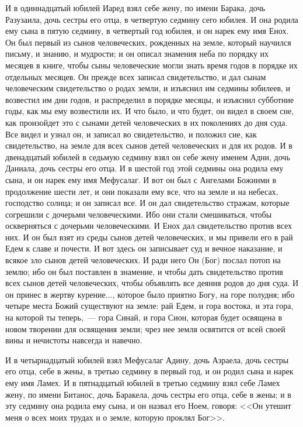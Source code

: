 И в одиннадцатый юбилей Иаред взял себе жену, по имени Барака, дочь
Разузаила, дочь сестры его отца, в четвертую седмину сего юбилея. И она родила
ему сына в пятую седмину, в четвертый год юбилея, и он нарек ему имя
Енох. Он был первый из сынов человеческих, рожденных на земле, который научился
письму, и знанию, и мудрости; и он описал знамения неба по порядку их месяцев в
книге, чтобы сыны человеческие могли знать время годов в порядке их отдельных
месяцев. Он прежде всех записал свидетельство, и дал сынам человеческим
свидетельство о родах земли, и изъяснил им седмины юбилеев, и возвестил им дни
годов, и распределил в порядке месяцы, и изъяснил субботние годы, как мы ему
возвестили их. И что было, и что будет, он видел в своем сне, как произойдет
это с сынами детей человеческих в их поколениях до дня суда. Все видел и узнал
он, и записал во свидетельство, и положил сие, как свидетельство, на земле для
всех сынов детей человеческих и для их родов. И в двенадцатый юбилей в седьмую
седмину взял он себе жену именем Адни, дочь Даниала, дочь сестры его отца. И в
шестой год этой седмины она родила ему сына, и он нарек ему имя Мефусалаг. И
вот он был с Ангелами Божиими в продолжение шести лет, и они показали ему все,
что на земле и на небесах, господство солнца; и он записал все. И он дал
свидетельство стражам, которые согрешили с дочерьми человеческими. Ибо они
стали смешиваться, чтобы оскверняться с дочерьми человеческими. И Енох дал
свидетельство против всех них. И он был взят из среды сынов детей человеческих,
и мы привели его в рай Едем к славе и почести. И вот здесь он записывает суд и
вечное наказание, и всякое зло сынов детей человеческих. И ради него Он (Бог)
послал потоп на землю; ибо он был поставлен в знамение, и чтобы дать
свидетельство против всех сынов детей человеческих, чтобы объявлять все деяния
родов до дня суда. И он принес в жертву курение..., которое было приятно Богу,
на горе полудня; ибо четыре места Божий существуют на земле: рай Едем, и гора
востока, и эта гора, на которой ты теперь,~--- гора Синай, и гора Сион,
которая будет освящена в новом творении для освящения земли; чрез нее земля
освятится от всей своей вины и нечистоты навсегда и навечно.

И в четырнадцатый юбилей взял Мефусалаг Адину, дочь Азраела, дочь сестры его
отца, себе в жены, в третью седмину в первый год, и он родил сына и нарек ему
имя Ламех. И в пятнадцатый юбилей в третью седмину взял себе Ламех жену, по
имени Битанос, дочь Баракела, дочь сестры его отца, себе в жены; и в эту
седмину она родила ему сына, и он назвал его Ноем, говоря: <<Он утешит меня
о всех моих трудах и о земле, которую проклял Бог>>.

